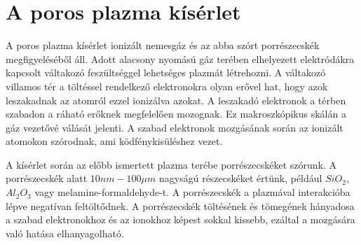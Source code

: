 \chapter{A poros plazma kísérlet}

	A poros plazma kísérlet ionizált nemesgáz és az abba szórt porrészecskék megfigyeléséből áll.
	Adott alacsony nyomású gáz terében elhelyezett elektródákra kapcsolt váltakozó feszültséggel 
	lehetséges plazmát létrehozni. A váltakozó villamos tér a töltéssel rendelkező elektronokra 
	olyan erővel hat, hogy azok leszakadnak az atomról ezzel ionizálva azokat.
	A leszakadó elektronok a térben szabadon a ráható erőknek megfelelően mozognak.
	Ez makroszkópikus skálán a gáz vezetővé válását jelenti. A szabad elektronok mozgásának
	során az ionizált atomokon szórodnak, ami ködfénykisüléshez vezet. 
	
	A kísérlet során az előbb ismertett plazma terébe porrészecskéket szórunk. A porrészecskék alatt
	$10nm - 100\mu m$ nagyságú részecskéket értünk, például $SiO_2$, $Al_2O_3$ vagy 
	melamine-formaldehyde-t. A porrészecskék a plazmával interakcióba lépve negatívan feltöltődnek.
	A porrészecskék töltésének és tömegének hányadosa a szabad elektronokhoz és az ionokhoz képest
	sokkal kissebb, ezáltal a mozgására való hatása elhanyagolható.
	
